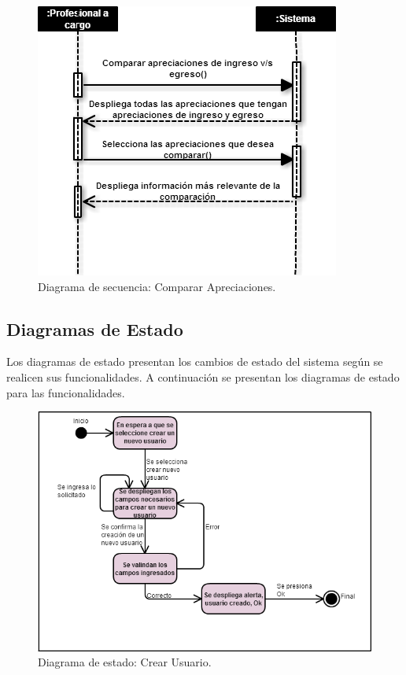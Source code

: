 \begin{figure}[htb]
	\label{dss9}
	\begin{center}
		\includegraphics[scale=0.5]{imagenes/comparar.png}
	\end{center}
	\caption{Diagrama de secuencia: Comparar Apreciaciones.}
\end{figure}

\newpage
\clearpage

\subsection{Diagramas de Estado}

Los diagramas de estado presentan los cambios de estado del sistema según se realicen sus funcionalidades. A continuación se presentan los diagramas de estado para las funcionalidades. 

\begin{figure}[htb]
	\label{dde1}
	\begin{center}
		\includegraphics[scale=0.5]{imagenes/crearusuario.png}
	\end{center}
	\caption{Diagrama de estado: Crear Usuario.}
\end{figure}

